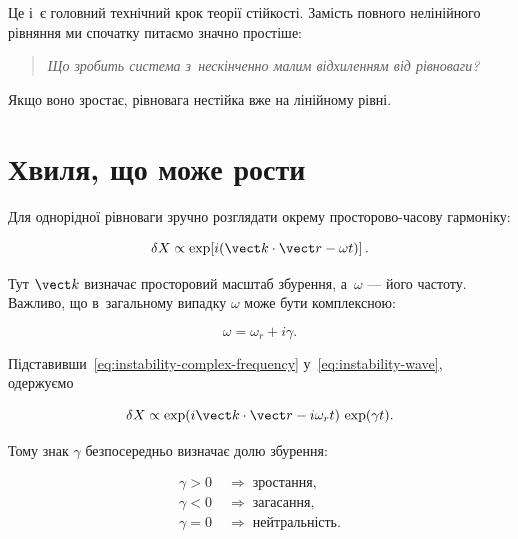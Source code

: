 Це і~є головний технічний крок теорії стійкості. Замість повного
нелінійного рівняння ми спочатку питаємо значно простіше:

\begin{quote}
\textit{Що зробить система з~нескінченно малим відхиленням від рівноваги?}
\end{quote}

Якщо воно зростає, рівновага нестійка вже на лінійному рівні.

\section{Хвиля, що може рости}

Для однорідної рівноваги зручно розглядати окрему просторово-часову
гармоніку:

\begin{equation}
\delta X
\propto
\exp\!\left[i(\vect k\cdot\vect r-\omega t)\right].
\label{eq:instability-wave}
\end{equation}

Тут $\vect k$ визначає просторовий масштаб збурення, а~$\omega$ ---
його частоту. Важливо, що в~загальному випадку $\omega$ може бути
комплексною:

\begin{equation}
\omega=\omega_r+i\gamma.
\label{eq:instability-complex-frequency}
\end{equation}

Підставивши~\eqref{eq:instability-complex-frequency} у~\eqref{eq:instability-wave}, одержуємо

\begin{equation}
\delta X
\propto
\exp(i\vect k\cdot\vect r-i\omega_r t)\,
\exp(\gamma t).
\label{eq:instability-amplitude}
\end{equation}

Тому знак $\gamma$ безпосередньо визначає долю збурення:

\begin{equation}
\begin{aligned}
\gamma>0 &\;\Rightarrow\; \text{зростання},\\
\gamma<0 &\;\Rightarrow\; \text{загасання},\\
\gamma=0 &\;\Rightarrow\; \text{нейтральність}.
\end{aligned}
\label{eq:instability-criterion}
\end{equation}

